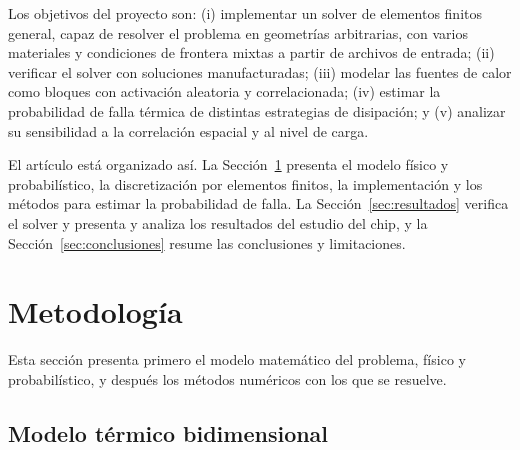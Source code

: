 \documentclass[preprint,11pt,sort&compress]{elsarticle}
\begin{document}
Los objetivos del proyecto son: (i) implementar un solver de elementos finitos general,
capaz de resolver el problema en geometrías arbitrarias, con varios materiales y
condiciones de frontera mixtas a partir de archivos de entrada; (ii) verificar el solver
con soluciones manufacturadas; (iii) modelar las fuentes de calor como bloques con
activación aleatoria y correlacionada; (iv) estimar la probabilidad de falla térmica de
distintas estrategias de disipación; y (v) analizar su sensibilidad a la correlación
espacial y al nivel de carga.

El artículo está organizado así. La Sección~\ref{sec:metodo} presenta el modelo físico y
probabilístico, la discretización por elementos finitos, la implementación y los métodos
para estimar la probabilidad de falla. La Sección~\ref{sec:resultados} verifica el solver y
presenta y analiza los resultados del estudio del chip, y la
Sección~\ref{sec:conclusiones} resume las conclusiones y limitaciones.

\section{Metodología}
\label{sec:metodo}

Esta sección presenta primero el modelo matemático del problema, físico y probabilístico,
y después los métodos numéricos con los que se resuelve.

\subsection{Modelo térmico bidimensional}
\label{sec:modelo}
\end{document}
